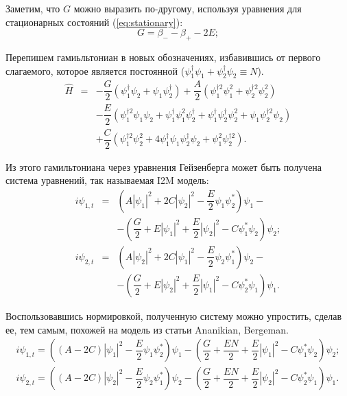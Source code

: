\documentclass[12pt]{article}
\begin{document}
%
Заметим, что $G$ можно выразить по-другому, используя уравнения для стационарных состояний (\ref{eq:stationary}):
%
\begin{equation}
G = \beta_- - \beta_+ - 2E;
\end{equation}
%

Перепишем гамиьльтониан в новых обозначениях, избавившись от первого слагаемого, которое является постоянной ($\psi_1^\dag \psi_1 + \psi_2^\dag \psi_2 \equiv N$).
%
\begin{equation}
\begin{array}{lcl}
	\hat{H} & = & -\dfrac{G}{2} (\psi_1^\dag \psi_2 +  \psi_1 \psi_2^\dag) + \dfrac{A}{2} (\psi_1^{\dag 2} \psi_1^2 + \psi_2^{\dag 2} \psi_2^2) \\[10pt]
	& & -\dfrac{E}{2} (\psi_1^{\dag 2} \psi_1 \psi_2 + \psi_1^\dag \psi_1^2 \psi_2^\dag + \psi_1^\dag \psi_2^\dag \psi_2^2 + \psi_1 \psi_2^{\dag 2} \psi_2) \\[10pt]
	& & +\dfrac{C}{2} (\psi_1^{\dag 2} \psi_2^2 + 4 \psi_1^\dag \psi_1 \psi_2^\dag \psi_2 + \psi_1^2 \psi_2^{\dag 2}).
\end{array}
\label{eq:hamiltonian}
\end{equation}
%

Из этого гамильтониана через уравнения Гейзенберга может быть получена система уравнений, так называемая I2M модель:
%
\begin{equation}
\begin{array}{lcl}
	i \psi_{1,t} & = & (A |\psi_1|^2 + 2C |\psi_2|^2 - \dfrac{E}{2} \psi_1 \psi_2^*) \psi_1 - \\[10pt]
	&& - (\dfrac{G}{2} + E |\psi_1|^2 + \dfrac{E}{2} |\psi_2|^2 - C \psi_1^* \psi_2) \psi_2; \\[10pt]
	i \psi_{2,t} & = & (A |\psi_2|^2 + 2C |\psi_1|^2 - \dfrac{E}{2} \psi_2 \psi_1^*) \psi_2 - \\[10pt] 
	&& - (\dfrac{G}{2} + E |\psi_2|^2 + \dfrac{E}{2}|\psi_1|^2 - C \psi_2^* \psi_1) \psi_1.
\end{array}
\label{eq:I2M}
\end{equation}
%

Воспользовавшись нормировкой, полученную систему можно упростить, сделав ее, тем самым, похожей на модель из статьи Ananikian, Bergeman.
%
\begin{equation*}
\begin{array}{c}
	i \psi_{1,t} = ((A - 2C) |\psi_1|^2 - \dfrac{E}{2} \psi_1 \psi_2^*) \psi_1 - (\dfrac{G}{2} + \dfrac{EN}{2} + \dfrac{E}{2} |\psi_1|^2 - C \psi_1^* \psi_2) \psi_2; \\[10pt]
	i \psi_{2,t} = ((A - 2C) |\psi_2|^2 - \dfrac{E}{2} \psi_2 \psi_1^*) \psi_2 - (\dfrac{G}{2} + \dfrac{EN}{2} + \dfrac{E}{2} |\psi_2|^2 - C \psi_2^* \psi_1) \psi_1.
\end{array}
\end{equation*}
%
\end{document}
